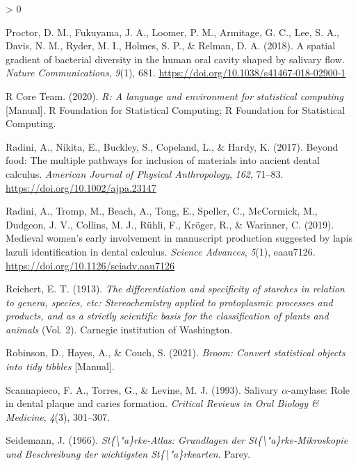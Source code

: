 \documentclass[
]{article}
\newlength{\cslhangindent}
\newenvironment{CSLReferences}[2] %
 {%
  \setlength{\parindent}{0pt}
  \ifodd #1 \everypar{\setlength{\hangindent}{\cslhangindent}}\ignorespaces\fi
  \ifnum #2 > 0
  \setlength{\parskip}{#2\baselineskip}
  \fi
 }%
 {}
\begin{document}
\begin{CSLReferences}{1}{0}
\leavevmode\hypertarget{ref-proctorSpatialGradient2018}{}%
Proctor, D. M., Fukuyama, J. A., Loomer, P. M., Armitage, G. C., Lee, S. A., Davis, N. M., Ryder, M. I., Holmes, S. P., \& Relman, D. A. (2018). A spatial gradient of bacterial diversity in the human oral cavity shaped by salivary flow. \emph{Nature Communications}, \emph{9}(1), 681. \url{https://doi.org/10.1038/s41467-018-02900-1}

\leavevmode\hypertarget{ref-R-base}{}%
R Core Team. (2020). \emph{R: A language and environment for statistical computing} {[}Manual{]}. {R Foundation for Statistical Computing}; {R Foundation for Statistical Computing}.

\leavevmode\hypertarget{ref-radiniFoodMultiplePathways2017}{}%
Radini, A., Nikita, E., Buckley, S., Copeland, L., \& Hardy, K. (2017). Beyond food: The multiple pathways for inclusion of materials into ancient dental calculus. \emph{American Journal of Physical Anthropology}, \emph{162}, 71--83. \url{https://doi.org/10.1002/ajpa.23147}

\leavevmode\hypertarget{ref-radiniMedievalWomenEarly2019}{}%
Radini, A., Tromp, M., Beach, A., Tong, E., Speller, C., McCormick, M., Dudgeon, J. V., Collins, M. J., Rühli, F., Kröger, R., \& Warinner, C. (2019). Medieval women's early involvement in manuscript production suggested by lapis lazuli identification in dental calculus. \emph{Science Advances}, \emph{5}(1), eaau7126. \url{https://doi.org/10.1126/sciadv.aau7126}

\leavevmode\hypertarget{ref-reichertStarchBible1913b}{}%
Reichert, E. T. (1913). \emph{The differentiation and specificity of starches in relation to genera, species, etc: Stereochemistry applied to protoplasmic processes and products, and as a strictly scientific basis for the classification of plants and animals} (Vol. 2). {Carnegie institution of Washington}.

\leavevmode\hypertarget{ref-R-broom}{}%
Robinson, D., Hayes, A., \& Couch, S. (2021). \emph{Broom: Convert statistical objects into tidy tibbles} {[}Manual{]}.

\leavevmode\hypertarget{ref-scannapiecoSalivaryAmylase1993}{}%
Scannapieco, F. A., Torres, G., \& Levine, M. J. (1993). Salivary {\(\alpha\)}-amylase: Role in dental plaque and caries formation. \emph{Critical Reviews in Oral Biology \& Medicine}, \emph{4}(3), 301--307.

\leavevmode\hypertarget{ref-seidemannStarchAtlas1966}{}%
Seidemann, J. (1966). \emph{St\{\textbackslash"a\}rke-{Atlas}: Grundlagen der {St}\{\textbackslash"a\}rke-{Mikroskopie} und {Beschreibung} der wichtigsten {St}\{\textbackslash"a\}rkearten}. {Parey}.


\end{CSLReferences}
\end{document}
